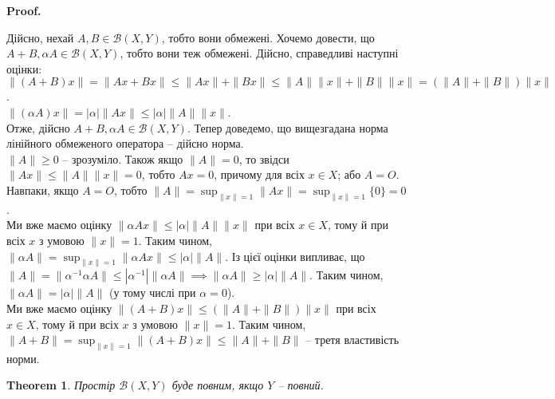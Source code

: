 \documentclass[a4paper, 10pt]{article}
\makeatletter
\theoremstyle{theoremdd}
\newtheorem{theorem}{Theorem}[subsection]
\theoremstyle{theoremdd}
\theoremstyle{theoremdd}
\theoremstyle{theoremdd}
\theoremstyle{theoremdd}
\theoremstyle{theoremdd}
\theoremstyle{theoremdd}
\theoremstyle{theoremdd}
\renewenvironment{proof}[1][Proof.\\]{\par
\pushQED{\hfill \qed}%
\normalfont \topsep6\p@\@plus6\p@\relax
\trivlist
\item\relax
{\bfseries
#1\@addpunct{.}}\hspace\labelsep\ignorespaces
}{%
\popQED\endtrivlist\@endpefalse
}
\makeatother
\begin{document}
\begin{proof}
Дійсно, нехай $A,B \in \mathcal{B}(X,Y)$, тобто вони обмежені. Хочемо довести, що $A+B, \alpha A \in \mathcal{B}(X,Y)$, тобто вони теж обмежені. Дійсно, справедливі наступні оцінки:\\
$\| (A+B) x \| = \| Ax + Bx \| \leq \|Ax \| + \|Bx\| \leq \|A\| \|x\| + \|B\| \|x \| = (\|A\| + \|B\|) \|x\|$.\\
$\| (\alpha A) x \| = |\alpha| \|Ax\| \leq |\alpha| \|A\| \|x\|$.\\
Отже, дійсно $A+B, \alpha A \in \mathcal{B}(X,Y)$. Тепер доведемо, що вищезгадана норма лінійного обмеженого оператора -- дійсно норма.\\
$\|A\| \geq 0$ -- зрозуміло. Також якщо $\|A\| = 0$, то звідси $\|Ax\| \leq \|A\| \|x\| = 0$, тобто $Ax = 0$, причому для всіх $x \in X$; або $A = O$. Навпаки, якщо $A = O$, тобто $\|A\| = \displaystyle\sup_{\|x\| = 1} \|Ax\| = \sup_{\|x\|= 1} \{0\} = 0$.\\
Ми вже маємо оцінку $\| \alpha Ax\| \leq |\alpha| \|A\| \|x\|$ при всіх $x \in X$, тому й при всіх $x$ з умовою $\|x\| = 1$. Таким чином, $\|\alpha A\| = \displaystyle\sup_{\|x\|= 1} \|\alpha Ax\| \leq |\alpha|\|A\|$. Із цієї оцінки випливає, що $\|A\| = \|\alpha^{-1} \alpha A\| \leq |\alpha^{-1}| \|\alpha A\| \implies \|\alpha A\| \geq |\alpha| \|A\|$. Таким чином, $\|\alpha A\| = |\alpha| \|A\|$ (у тому числі при $\alpha = 0$).\\
Ми вже маємо оцінку $\| (A+B) x\| \leq (\|A\| + \|B\|) \|x\|$ при всіх $x \in X$, тому й при всіх $x$ з умовою $\|x\| = 1$. Таким чином, $\|A+B\| = \displaystyle\sup_{\|x\| = 1} \|(A+B)x\| \leq \|A\| + \|B\|$ -- третя властивість норми.
\end{proof}

\begin{theorem}
Простір $\mathcal{B}(X,Y)$ буде повним, якщо $Y$ -- повний.
\end{theorem}
\end{document}
